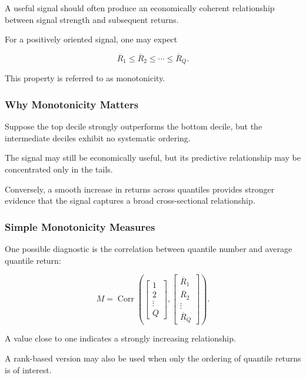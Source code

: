\documentclass[11pt,a4paper]{article}
\begin{document}
A useful signal should often produce an economically coherent relationship
between signal strength and subsequent returns.

For a positively oriented signal, one may expect

\begin{equation}
\boxed{
\overline{R}_1
\leq
\overline{R}_2
\leq
\cdots
\leq
\overline{R}_Q.
}
\end{equation}

This property is referred to as monotonicity.


\subsubsection{Why Monotonicity Matters}

Suppose the top decile strongly outperforms the bottom decile, but the
intermediate deciles exhibit no systematic ordering.

The signal may still be economically useful, but its predictive relationship
may be concentrated only in the tails.

Conversely, a smooth increase in returns across quantiles provides stronger
evidence that the signal captures a broad cross-sectional relationship.


\subsubsection{Simple Monotonicity Measures}

One possible diagnostic is the correlation between quantile number and average
quantile return:

\begin{equation}
\boxed{
M
=
\operatorname{Corr}
\left(
\begin{bmatrix}
1\\
2\\
\vdots\\
Q
\end{bmatrix},
\begin{bmatrix}
\overline{R}_1\\
\overline{R}_2\\
\vdots\\
\overline{R}_Q
\end{bmatrix}
\right).
}
\end{equation}

A value close to one indicates a strongly increasing relationship.

A rank-based version may also be used when only the ordering of quantile
returns is of interest.
\end{document}
